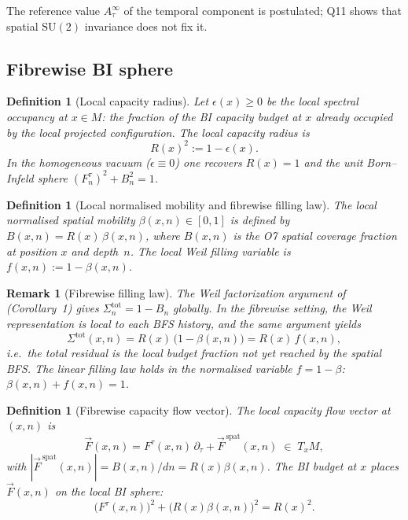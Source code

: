 \documentclass[11pt,a4paper]{article}
\newtheorem{definition}[theorem]{Definition}
\newtheorem{remark}[theorem]{Remark}
\begin{document}
    The reference value $A_\tau^{\infty}$ of the temporal component is postulated; Q11 shows that spatial
    $\mathrm{SU}(2)$ invariance does not fix it.

  \subsection{Fibrewise BI sphere}

    \begin{definition}[Local capacity radius]\label{def:radius}
      Let $\epsilon(x) \geq 0$ be the \emph{local spectral occupancy} at $x \in M$:
      the fraction of the BI capacity budget at $x$ already occupied by the local
      projected configuration.
      The \emph{local capacity radius} is
      \begin{equation}\label{eq:radius}
        R(x)^2 := 1 - \epsilon(x).
      \end{equation}
      In the homogeneous vacuum ($\epsilon \equiv 0$) one recovers $R(x) = 1$ and the
      unit Born--Infeld sphere $(F_n^\tau)^2 + B_n^2 = 1$.
    \end{definition}

    \begin{definition}[Local normalised mobility and fibrewise filling law]\label{def:local}
      The \emph{local normalised spatial mobility} $\beta(x,n) \in [0,1]$ is defined by
      $B(x,n) = R(x)\,\beta(x,n)$, where $B(x,n)$ is the O7 spatial coverage fraction
      at position $x$ and depth~$n$.
      The \emph{local Weil filling variable} is $f(x,n) := 1 - \beta(x,n)$.
    \end{definition}

    \begin{remark}[Fibrewise filling law]
The Weil factorization argument of~\cite{Beau2026n} (Corollary~1) gives
$\Sigma_n^{\mathrm{tot}} = 1-B_n$ globally.
In the fibrewise setting, the Weil representation is local to each BFS history,
and the same argument yields
\begin{equation}\label{eq:fillinglocal}
  \Sigma^{\mathrm{tot}}(x,n) = R(x)\,\bigl(1-\beta(x,n)\bigr) = R(x)\,f(x,n),
\end{equation}
i.e.\ the total residual is the local budget fraction not yet reached by the spatial BFS.
The linear filling law holds in the normalised variable $f = 1-\beta$:
$\beta(x,n) + f(x,n) = 1$.
    \end{remark}

    \begin{definition}[Fibrewise capacity flow vector]\label{def:fibrevector}
      The \emph{local capacity flow vector} at $(x,n)$ is
      \[
        \vec{F}(x,n) = F^\tau(x,n)\,\partial_\tau + \vec{F}^{\,\mathrm{spat}}(x,n)
        \;\in\; T_x M,
      \]
      with $|\vec{F}^{\,\mathrm{spat}}(x,n)| = B(x,n)/dn = R(x)\beta(x,n)$.
      The BI budget at $x$ places $\vec{F}(x,n)$ on the \emph{local BI sphere}:
      \begin{equation}\label{eq:BIlocal}
        \bigl(F^\tau(x,n)\bigr)^2 + \bigl(R(x)\beta(x,n)\bigr)^2 = R(x)^2.
      \end{equation}
    \end{definition}
\end{document}
